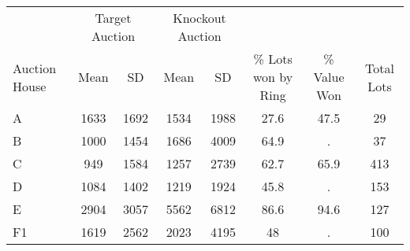 \begin{tabular}{lccccccc}
\toprule
& \multicolumn{2}{c}{Target Auction} & \multicolumn{2}{c}{Knockout Auction} & & & \\
\cmidrule(lr){2-3}\cmidrule(lr){4-5}
Auction House & Mean & SD & Mean & SD & \% Lots won by Ring & \% Value Won & Total Lots \\ \midrule
A & 1633 & 1692 & 1534 & 1988 & 27.6 & 47.5 & 29 \\
B & 1000 & 1454 & 1686 & 4009 & 64.9 & . & 37 \\
C & 949 & 1584 & 1257 & 2739 & 62.7 & 65.9 & 413 \\
D & 1084 & 1402 & 1219 & 1924 & 45.8 & . & 153 \\
E & 2904 & 3057 & 5562 & 6812 & 86.6 & 94.6 & 127 \\
F1 & 1619 & 2562 & 2023 & 4195 & 48 & . & 100 \\
\bottomrule
\end{tabular}
